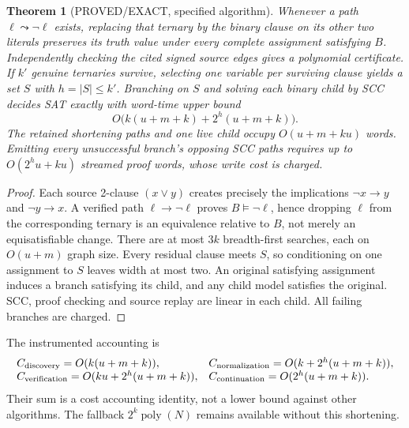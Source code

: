 \documentclass[11pt]{article}
\newtheorem{theorem}{Theorem}
\begin{document}
\begin{theorem}[PROVED/EXACT, specified algorithm]
Whenever a path $\ell\leadsto\neg\ell$ exists, replacing that ternary by the binary clause on its other two literals preserves its truth value under every complete assignment satisfying $B$. Independently checking the cited signed source edges gives a polynomial certificate. If $k'$ genuine ternaries survive, selecting one variable per surviving clause yields a set $S$ with $h=|S|\le k'$. Branching on $S$ and solving each binary child by SCC decides SAT exactly with word-time upper bound
\[
O\bigl(k(u+m+k)+2^h(u+m+k)\bigr).
\]
The retained shortening paths and one live child occupy $O(u+m+ku)$ words. Emitting every unsuccessful branch's opposing SCC paths requires up to $O(2^h u+ku)$ streamed proof words, whose write cost is charged.
\end{theorem}
\begin{proof}
Each source 2-clause $(x\vee y)$ creates precisely the implications $\neg x\to y$ and $\neg y\to x$. A verified path $\ell\to\neg\ell$ proves $B\models\neg\ell$, hence dropping $\ell$ from the corresponding ternary is an equivalence relative to $B$, not merely an equisatisfiable change. There are at most $3k$ breadth-first searches, each on $O(u+m)$ graph size. Every residual clause meets $S$, so conditioning on one assignment to $S$ leaves width at most two. An original satisfying assignment induces a branch satisfying its child, and any child model satisfies the original. SCC, proof checking and source replay are linear in each child. All failing branches are charged.
\end{proof}

The instrumented accounting is
\[
\begin{array}{ll}
C_{\rm discovery}=O(k(u+m+k)),&C_{\rm normalization}=O(k+2^h(u+m+k)),\\
C_{\rm verification}=O(ku+2^h(u+m+k)),&
C_{\rm continuation}=O(2^h(u+m+k)).
\end{array}
\]
Their sum is a cost accounting identity, not a lower bound against other algorithms. The fallback $2^k\operatorname{poly}(N)$ remains available without this shortening.
\end{document}
